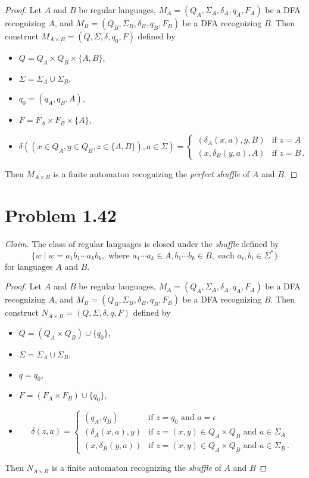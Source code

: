 \documentclass{abrice}
\begin{document}
\begin{proof}
  Let $A$ and $B$ be regular languages, $M_A = (Q_A, \Sigma_A, \delta_A, q_A,
  F_A)$ be a DFA recognizing $A$, and $M_B = (Q_B, \Sigma_B, \delta_B, q_B,
  F_B)$ be a DFA recognizing $B$. Then construct $M_{A \times B} = (Q, \Sigma, \delta,
  q_0, F)$ defined by
  \begin{itemize}
  \item $Q = Q_A \times Q_B \times \{A,B\}$,
  \item $\Sigma = \Sigma_A \cup \Sigma_B$,
  \item $q_0 = (q_A, q_B, A)$,
  \item $F = F_A \times F_B \times \{A\}$,
  \item
    \[
      \delta((x \in Q_A, y \in Q_B, z \in \{A, B\}), a \in \Sigma) =
      \begin{cases}
        (\delta_A(x,a),y,B) & \text{if } z = A \\
        (x, \delta_B(y,a), A) & \text{if } z = B\, .
      \end{cases}
    \]
  \end{itemize}
  Then $M_{A \times B}$ is a finite automaton recognizing the \emph{perfect
    shuffle} of $A$ and $B$.
\end{proof}

\section{Problem 1.42}

\emph{Claim.} The class of regular languages is closed under the \emph{shuffle}
defined by
\[ \{ w \mid w = a_1b_1 \cdots a_k b_k, \text{ where } a_1
\cdots a_k \in A, b_1 \cdots b_k \in B, \text{ each } a_i, b_i \in \Sigma^*
\} \]
for languages $A$ and $B$.

\begin{proof}
  Let $A$ and $B$ be regular languages, $M_A = (Q_A, \Sigma_A, \delta_A, q_A,
  F_A)$ be a DFA recognizing $A$, and $M_B = (Q_B, \Sigma_B, \delta_B, q_B,
  F_B)$ be a DFA recognizing $B$. Then construct $N_{A \times B} = (Q, \Sigma,
  \delta, q, F)$ defined by
  \begin{itemize}
  \item $Q = (Q_A \times Q_B) \cup \{q_0 \}$,
  \item $\Sigma = \Sigma_A \cup \Sigma_B$,
  \item $q = q_0$,
  \item $F = (F_A \times F_B) \cup \{ q_0\}$,
  \item
    \[
      \delta(z,a) =
      \begin{cases}
        (q_A, q_B) & \text{if } z = q_0 \text{ and } a = \epsilon \\
        (\delta_A(x,a), y) & \text{if } z = (x,y) \in Q_A \times Q_B \text{ and
        } a \in \Sigma_A \\
        (x, \delta_B(y,a)) & \text{if } z = (x,y) \in Q_A \times Q_B \text{ and
        } a \in \Sigma_B\, .
      \end{cases}
    \]
  \end{itemize}
  Then $N_{A \times B}$ is a finite automaton recognizing the \emph{shuffle} of
  $A$ and $B$
\end{proof}
\end{document}
